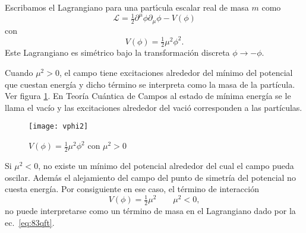 \begin{frame}
Escribamos el Lagrangiano para una part\'\i cula escalar real de masa $m$ como
\begin{equation}
\label{eq:83qft}
\mathcal{L}=\tfrac{1}{2}\partial^\mu\phi\partial_\mu\phi-V(\phi)
\end{equation}
con
\begin{equation}
  V(\phi)=\tfrac{1}{2}\mu^2\phi^2.
\end{equation}
Este Lagrangiano es simétrico bajo la transformación discreta $\phi\to-\phi$. 

Cuando $\mu^2\gt 0$, el campo tiene excitaciones alrededor del mínimo del potencial que cuestan energía y dicho término se interpreta como la masa de la partícula. Ver figura \ref{fig:x2}. En Teoría Cuántica de Campos al estado de mínima energía se le llama el vacío y las excitaciones alrededor del vació corresponden a las partículas.
\begin{figure} %
  \centering %
  \texttt{[image: vphi2]}
  \caption{$V(\phi)=\frac{1}{2}\mu^2 \phi^2$ con $\mu^2\gt 0$} %
  \label{fig:x2} %
\end{figure} %
\end{frame}
Si $\mu^2\lt 0$, no existe un mínimo del potencial alrededor del cual el campo pueda oscilar. Además el alejamiento del campo del punto de simetría del potencial no cuesta energía. Por consiguiente en ese caso, el término de interacción
\begin{equation}
  V(\phi)=\tfrac{1}{2}\mu^2   \qquad 
  \mu^2\lt 0,
\end{equation}
no puede interpretarse como un término de masa en el Lagrangiano dado por la ec.~\eqref{eq:83qft}. 

